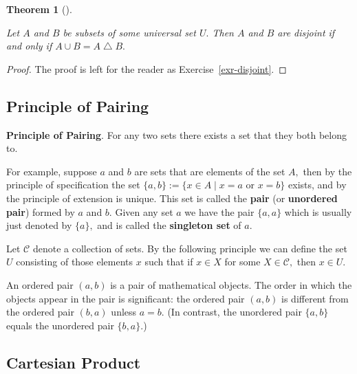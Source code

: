 \documentclass[
  letterpaper,
  10pt,
  reqno,
  twopage,
  openany]{book}
\theoremstyle{plain}
\theoremstyle{definition}
\theoremstyle{definition}
\theoremstyle{definition}
\theoremstyle{plain}
\theoremstyle{plain}
\newtheorem{theorem}{Theorem}[chapter]
\theoremstyle{remark}
\begin{document}
\leavevmode{}%
\begin{theorem}[]\label{thm-disjoint}

Let \(A\) and \(B\) be subsets of some universal set \(U.\) Then \(A\)
and \(B\) are disjoint if and only if \(A\cup B=A\bigtriangleup B.\)

\end{theorem}

\begin{proof}

The proof is left for the reader as Exercise~\ref{exr-disjoint}.

\end{proof}

\hypertarget{principle-of-pairing}{%
\subsection{Principle of Pairing}\label{principle-of-pairing}}

\textbf{Principle of Pairing}. For any two
sets there exists a set that they both belong to.

For example, suppose \(a\) and \(b\) are sets that are elements of the
set \(A,\) then by the principle of specification the set
\(\{a, b\}:=\{x\in A \mid x=a \text{ or } x=b \}\) exists, and by the
principle of extension is unique. This set is called the 
\textbf{pair} (or  \textbf{unordered pair}) formed
by \(a\) and \(b.\) Given any set \(a\) we have the pair \(\{a,a\}\)
which is usually just denoted by \(\{a\},\) and is called the
 \textbf{singleton set} of \(a.\)

Let \(\mathcal{C}\) denote a collection of sets. By the following
principle we can define the set \(U\) consisting of those elements \(x\)
such that if \(x\in X\) for some \(X\in \mathcal{C},\) then \(x\in U.\)

An ordered pair \((a, b)\) is a pair of mathematical objects. The order
in which the objects appear in the pair is significant: the ordered pair
\((a, b)\) is different from the ordered pair \((b, a)\) unless
\(a = b.\) (In contrast, the unordered pair \(\{a, b\}\) equals the
unordered pair \(\{b, a\}.\))

\hypertarget{cartesian-product}{%
\subsection{Cartesian Product}\label{cartesian-product}}
\end{document}
